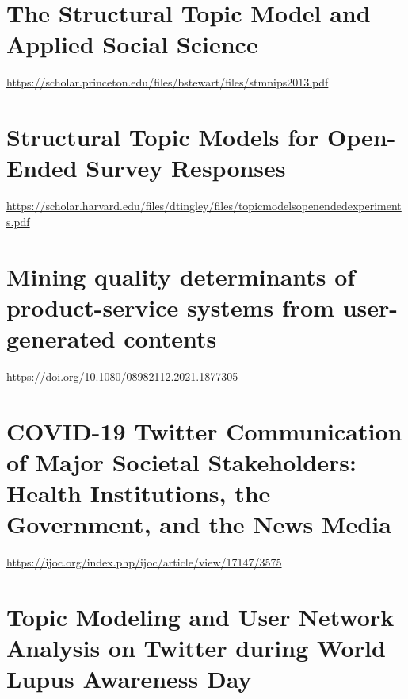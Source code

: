 \documentclass[
]{book}
\begin{document}
\hypertarget{the-structural-topic-model-and-applied-social-science}{%
\section{The Structural Topic Model and Applied Social Science}\label{the-structural-topic-model-and-applied-social-science}}

\url{https://scholar.princeton.edu/files/bstewart/files/stmnips2013.pdf}

\hypertarget{structural-topic-models-for-open-ended-survey-responses}{%
\section{Structural Topic Models for Open-Ended Survey Responses}\label{structural-topic-models-for-open-ended-survey-responses}}

\url{https://scholar.harvard.edu/files/dtingley/files/topicmodelsopenendedexperiments.pdf}

\hypertarget{mining-quality-determinants-of-product-service-systems-from-user-generated-contents}{%
\section{Mining quality determinants of product-service systems from user-generated contents}\label{mining-quality-determinants-of-product-service-systems-from-user-generated-contents}}

\url{https://doi.org/10.1080/08982112.2021.1877305}

\hypertarget{covid-19-twitter-communication-of-major-societal-stakeholders-health-institutions-the-government-and-the-news-media}{%
\section{COVID-19 Twitter Communication of Major Societal Stakeholders: Health Institutions, the Government, and the News Media}\label{covid-19-twitter-communication-of-major-societal-stakeholders-health-institutions-the-government-and-the-news-media}}

\url{https://ijoc.org/index.php/ijoc/article/view/17147/3575}

\hypertarget{topic-modeling-and-user-network-analysis-on-twitter-during-world-lupus-awareness-day}{%
\section{Topic Modeling and User Network Analysis on Twitter during World Lupus Awareness Day}\label{topic-modeling-and-user-network-analysis-on-twitter-during-world-lupus-awareness-day}}
\end{document}
